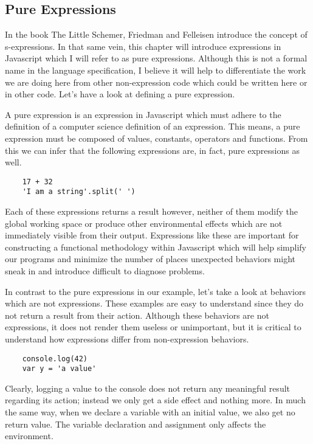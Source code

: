 \documentclass[a4paper,12pt,twoside]{book}
\begin{document}
\subsection{Pure Expressions}
 
 In the book The Little Schemer, Friedman and Felleisen introduce the concept of s-expressions.  In that same vein, this chapter will introduce expressions in Javascript which I will refer to as pure expressions.  Although this is not a formal name in the language specification, I believe it will help to differentiate the work we are doing here from other non-expression code which could be written here or in other code. Let's have a look at defining a pure expression. 
 
 A pure expression is an expression in Javascript which must adhere to the definition of a computer science definition of an expression.  This means, a pure expression must be composed of values, constants, operators and functions. From this we can infer that the following expressions are, in fact, pure expressions as well.
 
\begin{lstlisting}
    17 + 32
    'I am a string'.split(' ')
\end{lstlisting}
 
 Each of these expressions returns a result however, neither of them modify the global working space or produce other environmental effects which are not immediately visible from their output.  Expressions like these are important for constructing a functional methodology within Javascript which will help simplify our programs and minimize the number of places unexpected behaviors might sneak in and introduce difficult to diagnose problems.
 
 In contrast to the pure expressions in our example, let's take a look at behaviors which are not expressions.  These examples are easy to understand since they do not return a result from their action. Although these behaviors are not expressions, it does not render them useless or unimportant, but it is critical to understand how expressions differ from non-expression behaviors.
 
\begin{lstlisting}
    console.log(42)
    var y = 'a value'
\end{lstlisting}
 
 Clearly, logging a value to the console does not return any meaningful result regarding its action; instead we only get a side effect and nothing more.  In much the same way, when we declare a variable with an initial value, we also get no return value. The variable declaration and assignment only affects the environment.
 
\end{document}
